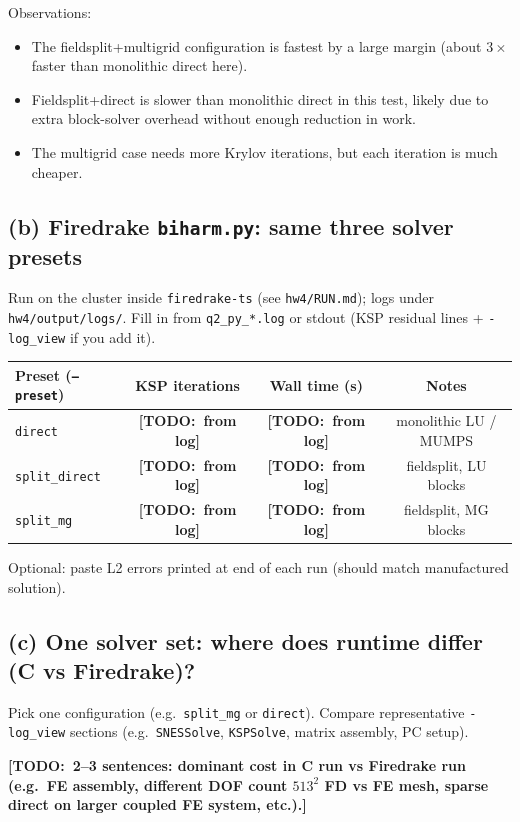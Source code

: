 \documentclass[11pt]{article}
\newcommand{\missing}[1]{\textbf{[TODO:~#1]}}
\begin{document}
Observations:
\begin{itemize}
  \item The fieldsplit+multigrid configuration is fastest by a large margin (about $3\times$ faster than monolithic direct here).
  \item Fieldsplit+direct is slower than monolithic direct in this test, likely due to extra block-solver overhead without enough reduction in work.
  \item The multigrid case needs more Krylov iterations, but each iteration is much cheaper.
\end{itemize}

\subsection*{(b) Firedrake \texttt{biharm.py}: same three solver presets}
Run on the cluster inside \texttt{firedrake-ts} (see \texttt{hw4/RUN.md}); logs under \texttt{hw4/output/logs/}. Fill in from \texttt{q2\_py\_*.log} or stdout (KSP residual lines + \texttt{-log\_view} if you add it).

\begin{center}
\begin{tabular}{lccc}
\toprule
Preset (\texttt{--preset}) & KSP iterations & Wall time (s) & Notes \\
\midrule
\texttt{direct} & \missing{from log} & \missing{from log} & monolithic LU / MUMPS \\
\texttt{split\_direct} & \missing{from log} & \missing{from log} & fieldsplit, LU blocks \\
\texttt{split\_mg} & \missing{from log} & \missing{from log} & fieldsplit, MG blocks \\
\bottomrule
\end{tabular}
\end{center}

Optional: paste L2 errors printed at end of each run (should match manufactured solution).

\subsection*{(c) One solver set: where does runtime differ (C vs Firedrake)?}
Pick one configuration (e.g.\ \texttt{split\_mg} or \texttt{direct}). Compare representative \texttt{-log\_view} sections (e.g.\ \texttt{SNESSolve}, \texttt{KSPSolve}, matrix assembly, PC setup).

\missing{2--3 sentences: dominant cost in C run vs Firedrake run (e.g.\ FE assembly, different DOF count $513^2$ FD vs FE mesh, sparse direct on larger coupled FE system, etc.).}
\end{document}
